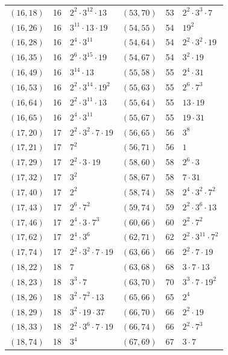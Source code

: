 \documentclass[11pt]{article}
\begin{document}
\begin{longtable}{@{}lrl@{\qquad}lrl@{}}
$(16,18)$ & 16 & $2^{2}\cdot 3^{12}\cdot 13$ & $(53,70)$ & 53 & $2^{2}\cdot 3^{3}\cdot 7$\\
$(16,26)$ & 16 & $3^{11}\cdot 13\cdot 19$ & $(54,55)$ & 54 & $19^{2}$\\
$(16,28)$ & 16 & $2^{4}\cdot 3^{11}$ & $(54,64)$ & 54 & $2^{2}\cdot 3^{2}\cdot 19$\\
$(16,35)$ & 16 & $2^{6}\cdot 3^{15}\cdot 19$ & $(54,67)$ & 54 & $3^{2}\cdot 19$\\
$(16,49)$ & 16 & $3^{14}\cdot 13$ & $(55,58)$ & 55 & $2^{4}\cdot 31$\\
$(16,53)$ & 16 & $2^{2}\cdot 3^{14}\cdot 19^{2}$ & $(55,63)$ & 55 & $2^{6}\cdot 7^{3}$\\
$(16,64)$ & 16 & $2^{2}\cdot 3^{11}\cdot 13$ & $(55,64)$ & 55 & $13\cdot 19$\\
$(16,65)$ & 16 & $2^{4}\cdot 3^{11}$ & $(55,67)$ & 55 & $19\cdot 31$\\
$(17,20)$ & 17 & $2^{2}\cdot 3^{2}\cdot 7\cdot 19$ & $(56,65)$ & 56 & $3^{8}$\\
$(17,21)$ & 17 & $7^{2}$ & $(56,71)$ & 56 & $1$\\
$(17,29)$ & 17 & $2^{2}\cdot 3\cdot 19$ & $(58,60)$ & 58 & $2^{6}\cdot 3$\\
$(17,32)$ & 17 & $3^{2}$ & $(58,67)$ & 58 & $7\cdot 31$\\
$(17,40)$ & 17 & $2^{2}$ & $(58,74)$ & 58 & $2^{4}\cdot 3^{2}\cdot 7^{2}$\\
$(17,43)$ & 17 & $2^{6}\cdot 7^{2}$ & $(59,74)$ & 59 & $2^{2}\cdot 3^{6}\cdot 13$\\
$(17,46)$ & 17 & $2^{4}\cdot 3\cdot 7^{3}$ & $(60,66)$ & 60 & $2^{2}\cdot 7^{2}$\\
$(17,62)$ & 17 & $2^{4}\cdot 3^{6}$ & $(62,71)$ & 62 & $2^{2}\cdot 3^{11}\cdot 7^{2}$\\
$(17,74)$ & 17 & $2^{2}\cdot 3^{2}\cdot 7\cdot 19$ & $(63,66)$ & 66 & $2^{2}\cdot 7\cdot 19$\\
$(18,22)$ & 18 & $7$ & $(63,68)$ & 68 & $3\cdot 7\cdot 13$\\
$(18,23)$ & 18 & $3^{3}\cdot 7$ & $(63,70)$ & 70 & $3^{3}\cdot 7\cdot 19^{2}$\\
$(18,26)$ & 18 & $3^{2}\cdot 7^{2}\cdot 13$ & $(65,66)$ & 65 & $2^{4}$\\
$(18,29)$ & 18 & $3^{2}\cdot 19\cdot 37$ & $(66,70)$ & 66 & $2^{2}\cdot 19$\\
$(18,33)$ & 18 & $2^{2}\cdot 3^{6}\cdot 7\cdot 19$ & $(66,74)$ & 66 & $2^{2}\cdot 7^{3}$\\
$(18,74)$ & 18 & $3^{4}$ & $(67,69)$ & 67 & $3\cdot 7$\\

\end{longtable}
\end{document}
